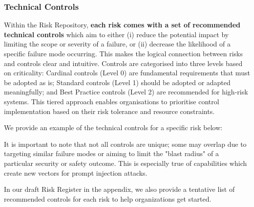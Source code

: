 \documentclass{article}
\begin{document}
\subsubsection{Technical Controls}

Within the Risk Repository, \textbf{each risk comes with a set of recommended technical controls} which aim to either (i) reduce the potential impact by limiting the scope or severity of a failure, or (ii) decrease the likelihood of a specific failure mode occurring. This makes the logical connection between risks and controls clear and intuitive. Controls are categorised into three levels based on criticality: Cardinal controls (Level 0) are fundamental requirements that must be adopted as is; Standard controls (Level 1) should be adopted or adapted meaningfully; and Best Practice controls (Level 2) are recommended for high-risk systems. This tiered approach enables organisations to prioritise control implementation based on their risk tolerance and resource constraints.

We provide an example of the technical controls for a specific risk below:


It is important to note that not all controls are unique; some may overlap due to targeting similar failure modes or aiming to limit the "blast radius" of a particular security or safety outcome. This is especially true of capabilities which create new vectors for prompt injection attacks.

In our draft Risk Register in the appendix, we also provide a tentative list of recommended controls for each risk to help organizations get started.
\end{document}

